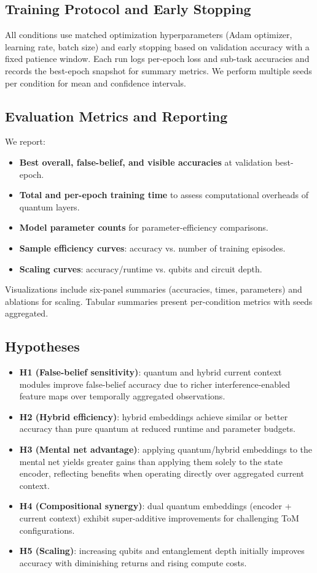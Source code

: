 \subsection{Training Protocol and Early Stopping}
All conditions use matched optimization hyperparameters (Adam optimizer, learning rate, batch size) and early stopping based on validation accuracy with a fixed patience window. Each run logs per-epoch loss and sub-task accuracies and records the best-epoch snapshot for summary metrics. We perform multiple seeds per condition for mean and confidence intervals.

\subsection{Evaluation Metrics and Reporting}
We report:
\begin{itemize}
  \item \textbf{Best overall, false-belief, and visible accuracies} at validation best-epoch.
  \item \textbf{Total and per-epoch training time} to assess computational overheads of quantum layers.
  \item \textbf{Model parameter counts} for parameter-efficiency comparisons.
  \item \textbf{Sample efficiency curves}: accuracy vs. number of training episodes.
  \item \textbf{Scaling curves}: accuracy/runtime vs. qubits and circuit depth.
\end{itemize}
Visualizations include six-panel summaries (accuracies, times, parameters) and ablations for scaling. Tabular summaries present per-condition metrics with seeds aggregated.

\subsection{Hypotheses}
\begin{itemize}
  \item \textbf{H1 (False-belief sensitivity)}: quantum and hybrid current context modules improve false-belief accuracy due to richer interference-enabled feature maps over temporally aggregated observations.
  \item \textbf{H2 (Hybrid efficiency)}: hybrid embeddings achieve similar or better accuracy than pure quantum at reduced runtime and parameter budgets.
  \item \textbf{H3 (Mental net advantage)}: applying quantum/hybrid embeddings to the mental net yields greater gains than applying them solely to the state encoder, reflecting benefits when operating directly over aggregated current context.
  \item \textbf{H4 (Compositional synergy)}: dual quantum embeddings (encoder + current context) exhibit super-additive improvements for challenging ToM configurations.
  \item \textbf{H5 (Scaling)}: increasing qubits and entanglement depth initially improves accuracy with diminishing returns and rising compute costs.
\end{itemize}

